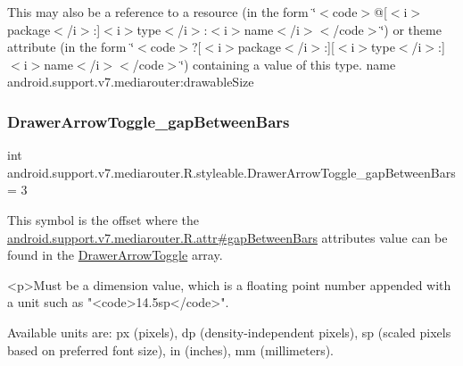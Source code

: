 This may also be a reference to a resource (in the form \char`\"{}$<$code$>$@\mbox{[}$<$i$>$package$<$/i$>$\+:\mbox{]}$<$i$>$type$<$/i$>$\+:$<$i$>$name$<$/i$>$$<$/code$>$\char`\"{}) or theme attribute (in the form \char`\"{}$<$code$>$?\mbox{[}$<$i$>$package$<$/i$>$\+:\mbox{]}\mbox{[}$<$i$>$type$<$/i$>$\+:\mbox{]}$<$i$>$name$<$/i$>$$<$/code$>$\char`\"{}) containing a value of this type.  name android.\+support.\+v7.\+mediarouter\+:drawable\+Size \mbox{\label{classandroid_1_1support_1_1v7_1_1mediarouter_1_1R_1_1styleable_a9ab9b13a15b2523a68b1fd3f98d047be}} 
\subsubsection{\texorpdfstring{Drawer\+Arrow\+Toggle\+\_\+gap\+Between\+Bars}{DrawerArrowToggle\_gapBetweenBars}}
{\footnotesize\ttfamily int android.\+support.\+v7.\+mediarouter.\+R.\+styleable.\+Drawer\+Arrow\+Toggle\+\_\+gap\+Between\+Bars = 3\hspace{0.3cm}{\ttfamily [static]}}

This symbol is the offset where the \hyperlink{classandroid_1_1support_1_1v7_1_1mediarouter_1_1R_1_1attr_a21045eca06d08dbc355554d3ab7fc8ab}{android.\+support.\+v7.\+mediarouter.\+R.\+attr\#gap\+Between\+Bars} attribute\textquotesingle{}s value can be found in the \hyperlink{classandroid_1_1support_1_1v7_1_1mediarouter_1_1R_1_1styleable_a71030bdd9f81aafe32f56767ba04e5b0}{Drawer\+Arrow\+Toggle} array.

\begin{DoxyVerb}      <p>Must be a dimension value, which is a floating point number appended with a unit such as "<code>14.5sp</code>".
\end{DoxyVerb}
 Available units are\+: px (pixels), dp (density-\/independent pixels), sp (scaled pixels based on preferred font size), in (inches), mm (millimeters). 

